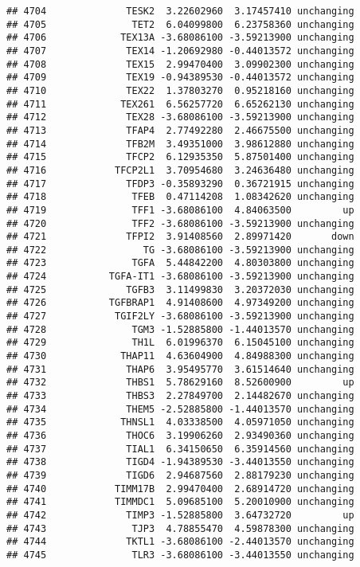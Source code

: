 \documentclass[]{article}
\begin{document}
\begin{verbatim}
## 4704              TESK2  3.22602960  3.17457410 unchanging
## 4705               TET2  6.04099800  6.23758360 unchanging
## 4706             TEX13A -3.68086100 -3.59213900 unchanging
## 4707              TEX14 -1.20692980 -0.44013572 unchanging
## 4708              TEX15  2.99470400  3.09902300 unchanging
## 4709              TEX19 -0.94389530 -0.44013572 unchanging
## 4710              TEX22  1.37803270  0.95218160 unchanging
## 4711             TEX261  6.56257720  6.65262130 unchanging
## 4712              TEX28 -3.68086100 -3.59213900 unchanging
## 4713              TFAP4  2.77492280  2.46675500 unchanging
## 4714              TFB2M  3.49351000  3.98612880 unchanging
## 4715              TFCP2  6.12935350  5.87501400 unchanging
## 4716            TFCP2L1  3.70954680  3.24636480 unchanging
## 4717              TFDP3 -0.35893290  0.36721915 unchanging
## 4718               TFEB  0.47114208  1.08342620 unchanging
## 4719               TFF1 -3.68086100  4.84063500         up
## 4720               TFF2 -3.68086100 -3.59213900 unchanging
## 4721              TFPI2  3.91408560  2.89971420       down
## 4722                 TG -3.68086100 -3.59213900 unchanging
## 4723               TGFA  5.44842200  4.80303800 unchanging
## 4724           TGFA-IT1 -3.68086100 -3.59213900 unchanging
## 4725              TGFB3  3.11499830  3.20372030 unchanging
## 4726           TGFBRAP1  4.91408600  4.97349200 unchanging
## 4727            TGIF2LY -3.68086100 -3.59213900 unchanging
## 4728               TGM3 -1.52885800 -1.44013570 unchanging
## 4729               TH1L  6.01996370  6.15045100 unchanging
## 4730             THAP11  4.63604900  4.84988300 unchanging
## 4731              THAP6  3.95495770  3.61514640 unchanging
## 4732              THBS1  5.78629160  8.52600900         up
## 4733              THBS3  2.27849700  2.14482670 unchanging
## 4734              THEM5 -2.52885800 -1.44013570 unchanging
## 4735             THNSL1  4.03338500  4.05971050 unchanging
## 4736              THOC6  3.19906260  2.93490360 unchanging
## 4737              TIAL1  6.34150650  6.35914560 unchanging
## 4738              TIGD4 -1.94389530 -3.44013550 unchanging
## 4739              TIGD6  2.94687560  2.88179230 unchanging
## 4740            TIMM17B  2.99470400  2.68914720 unchanging
## 4741            TIMMDC1  5.09685100  5.20010900 unchanging
## 4742              TIMP3 -1.52885800  3.64732720         up
## 4743               TJP3  4.78855470  4.59878300 unchanging
## 4744              TKTL1 -3.68086100 -2.44013570 unchanging
## 4745               TLR3 -3.68086100 -3.44013550 unchanging

\end{verbatim}
\end{document}
